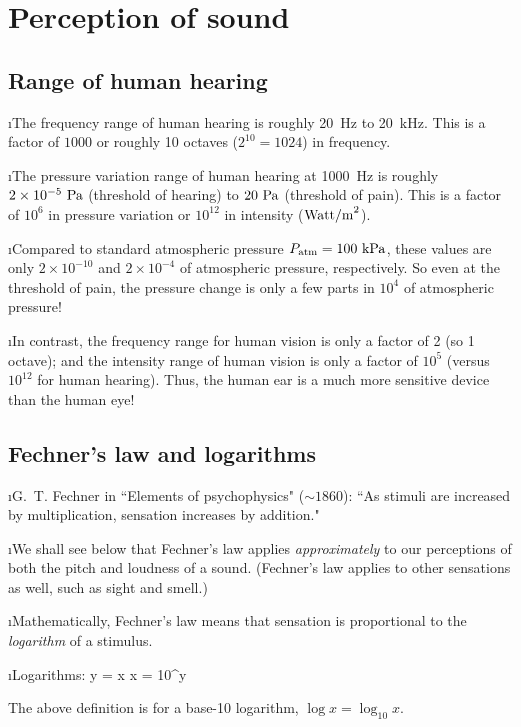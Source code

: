 \section{Perception of sound}

\subsection{Range of human hearing}
\bi

\i The frequency range of human hearing is roughly
20~Hz to 20~kHz.
This is a factor of $1000$ or roughly 10 octaves
($2^{10} = 1024$) in frequency.

\i The pressure variation range of human hearing at 1000~Hz is
roughly $2\times 10^{-5}~{\rm Pa}$ (threshold of hearing)
to $20~{\rm Pa}$ (threshold of pain).
This is a factor of $10^6$ in pressure variation or $10^{12}$
in intensity (${\rm Watt/m}^2$).

\i Compared to standard atmospheric pressure $P_{\rm atm} = 100~{\rm kPa}$,
these values are only $2\times 10^{-10}$ and
$2\times 10^{-4}$ of atmospheric pressure, respectively.
So even at the threshold of pain, the pressure change is only a few 
parts in $10^4$ of atmospheric pressure!

\i In contrast, the frequency range for human vision is
only a factor of 2 (so 1 octave);
and the intensity range of human vision is only a factor of
$10^5$ (versus $10^{12}$ for human hearing).
Thus, the human ear is a much more sensitive device than the
human eye!

\ei
\subsection{Fechner's law and logarithms}
\bi

\i G.~T. Fechner in ``Elements of psychophysics" ($\sim 1860$):
``As stimuli are increased by multiplication, sensation
increases by addition."

\i We shall see below that Fechner's law applies
{\em approximately} to our perceptions of both the 
pitch and loudness of a sound.
(Fechner's law applies to other sensations as well, 
such as sight and smell.)

\i Mathematically, Fechner's law means that sensation is 
proportional to the {\em logarithm} of a stimulus.

\i Logarithms:
%
\be
y = \log x 
\quad\Leftrightarrow\quad
x = 10^y
\ee

The above definition is for a base-10 logarithm,
$\log x = \log_{10}x$.

